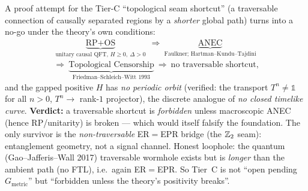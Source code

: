 \begin{gapbox}
A proof attempt for the Tier-C ``topological seam shortcut'' (a traversable connection of causally
separated regions by a \emph{shorter} global path) turns into a no-go under the theory's own conditions:
\[
  \begin{gathered}
  \underbrace{\text{RP}+\text{OS}}_{\text{unitary causal QFT, }H\ge0,\ \Delta>0}\ \Rightarrow\
  \underbrace{\text{ANEC}}_{\text{Faulkner; Hartman--Kundu--Tajdini}}\\[3pt]
  \Rightarrow\
  \underbrace{\text{Topological Censorship}}_{\text{Friedman--Schleich--Witt 1993}}\ \Rightarrow\ \text{no traversable shortcut,}
  \end{gathered}
\]
and the gapped positive $H$ has \emph{no periodic orbit} (verified: the transport $T^n\neq\mathbb 1$ for all
$n>0$, $T^n\to$ rank-$1$ projector), the discrete analogue of \emph{no closed timelike curve}. \textbf{Verdict:}
a traversable shortcut is \emph{forbidden} unless macroscopic ANEC (hence RP/unitarity) is broken --- which
would itself falsify the foundation. The only survivor is the \emph{non-traversable} ER$=$EPR bridge (the
$\mathbb Z_2$ seam): entanglement geometry, not a signal channel. Honest loophole: the quantum (Gao--Jafferis--Wall
2017) traversable wormhole exists but is \emph{longer} than the ambient path (no FTL), i.e.\ again ER$=$EPR.
So Tier~C is not ``open pending $G_{\mathrm{metric}}$'' but ``forbidden unless the theory's positivity breaks''.
\end{gapbox}

